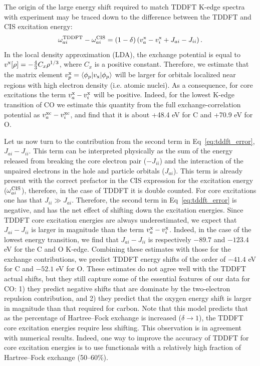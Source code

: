 \documentclass{article}
\begin{document}
The origin of the large energy shift required to match TDDFT K-edge spectra with experiment may be traced down to the difference between the TDDFT and CIS excitation energy:
\begin{equation} \label{eq:tddft_error}
\omega_{ai}^{\rm{TDDFT}} - \omega_{ai}^{\text{CIS}} = (1-\delta) \left(v^{\text{x}}_{a} -v^{\text{x}}_{i} + J_{ai} -  J_{ii}\right).
\end{equation}
In the local density approximation (LDA), the exchange potential is equal to $v^{\rm x}[\rho] = - \frac{4}{3} C_x \rho^{1/3}$, where $C_x$ is a positive constant.
Therefore, we estimate that the matrix element $v^{\rm x}_{p} = \langle \phi_p|v_{\text{x}}|\phi_p\rangle$ will be larger for orbitals localized near regions with high electron density (i.e. atomic nuclei).  
As a consequence, for core excitations the term $v^{\rm x}_{a} -v^{\rm x}_{i}$ will be positive.
Indeed, for the lowest K-edge transition of CO we estimate this quantity from the full exchange-correlation potential as $v^{\rm xc}_{a} -v^{\rm xc}_{i}$, and find that it is about +48.4 eV for C and +70.9 eV for O.

Let us now turn to the contribution from the second term in Eq~\eqref{eq:tddft_error}, $J_{ai} -  J_{ii}$.
This term can be interpreted physically as the sum of the energy released from breaking the core electron pair ($-J_{ii}$) and the interaction of the unpaired electrons in the hole and particle orbitals ($J_{ai}$).
This term is already present with the correct prefactor in the CIS expression for the excitation energy ($\omega_{ai}^{\rm{CIS}}$), therefore, in the case of TDDFT it is double counted.
For core excitations one has that $J_{ii} \gg J_{ai}$.  Therefore, the second term in Eq~\eqref{eq:tddft_error} is negative, and has the net effect of shifting down the excitation energies.
Since TDDFT core excitation energies are always underestimated, we expect that $J_{ai} -  J_{ii}$ is larger in magnitude than the term $v^{\rm x}_{a} -v^{\rm x}_{i}$.
Indeed, in the case of the lowest energy transition, we find that $J_{ai} -  J_{ii}$ is respectively $-89.7$ and $-123.4$ eV for the C and O K-edge.
Combining these estimates with those for the exchange contributions, we predict TDDFT energy shifts of the order of $-41.4$ eV for C and $-52.1$ eV for O.
These estimates do not agree well with the TDDFT actual shifts, but they still capture some of the essential features of our data for CO: 1) they predict negative shifts that are dominate by the two-electron repulsion contribution, and 2) they predict that the oxygen energy shift is larger in magnitude than that required for carbon.
Note that this model predicts that as the percentage of Hartree--Fock exchange is increased ($\delta \rightarrow 1$), the TDDFT core excitation energies require less shifting.
This observation is in agreement with numerical results.
Indeed, one way to improve the accuracy of TDDFT for core excitation energies is to use functionals with a relatively high fraction of Hartree--Fock exchange (50--60\%).\cite{Besly-57p}
\end{document}
